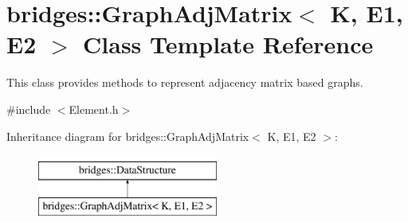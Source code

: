 \hypertarget{classbridges_1_1_graph_adj_matrix}{}\section{bridges\+:\+:Graph\+Adj\+Matrix$<$ K, E1, E2 $>$ Class Template Reference}
\label{classbridges_1_1_graph_adj_matrix}


This class provides methods to represent adjacency matrix based graphs.  




{\ttfamily \#include $<$Element.\+h$>$}

Inheritance diagram for bridges\+:\+:Graph\+Adj\+Matrix$<$ K, E1, E2 $>$\+:\begin{figure}[H]
\begin{center}
\leavevmode
\includegraphics[height=2.000000cm]{classbridges_1_1_graph_adj_matrix}
\end{center}
\end{figure}
